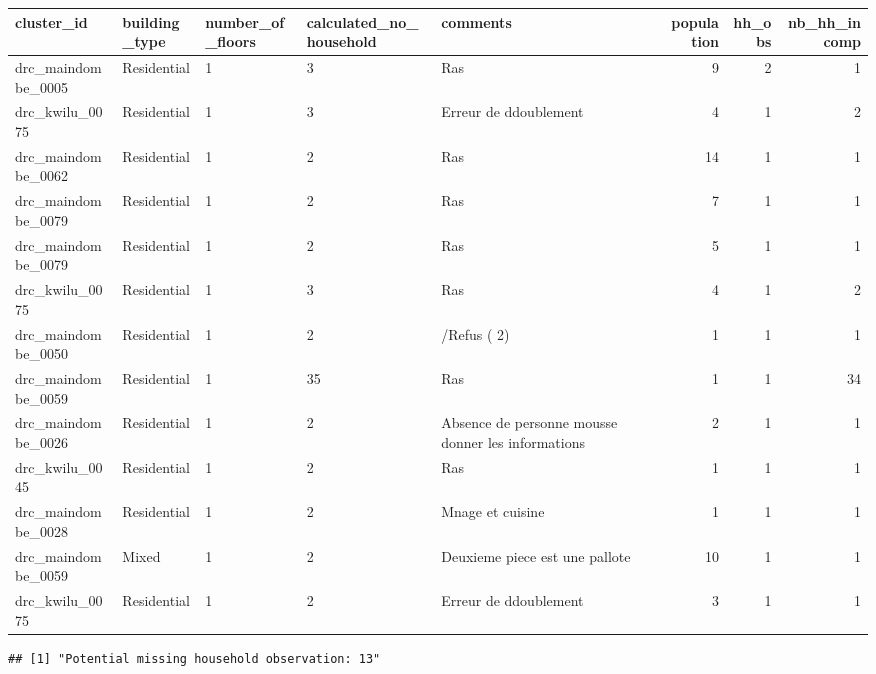 \documentclass[]{article}
\begin{document}
\begin{longtable}[]{@{}lllllrrr@{}}
\toprule
cluster\_id & building\_type & number\_of\_floors &
calculated\_no\_household & comments & population & hh\_obs &
nb\_hh\_incomp\tabularnewline
\midrule
\endhead
drc\_maindombe\_0005 & Residential & 1 & 3 & Ras & 9 & 2 &
1\tabularnewline
drc\_kwilu\_0075 & Residential & 1 & 3 & Erreur de ddoublement & 4 & 1 &
2\tabularnewline
drc\_maindombe\_0062 & Residential & 1 & 2 & Ras & 14 & 1 &
1\tabularnewline
drc\_maindombe\_0079 & Residential & 1 & 2 & Ras & 7 & 1 &
1\tabularnewline
drc\_maindombe\_0079 & Residential & 1 & 2 & Ras & 5 & 1 &
1\tabularnewline
drc\_kwilu\_0075 & Residential & 1 & 3 & Ras & 4 & 1 & 2\tabularnewline
drc\_maindombe\_0050 & Residential & 1 & 2 & /Refus ( 2) & 1 & 1 &
1\tabularnewline
drc\_maindombe\_0059 & Residential & 1 & 35 & Ras & 1 & 1 &
34\tabularnewline
drc\_maindombe\_0026 & Residential & 1 & 2 & Absence de personne mousse
donner les informations & 2 & 1 & 1\tabularnewline
drc\_kwilu\_0045 & Residential & 1 & 2 & Ras & 1 & 1 & 1\tabularnewline
drc\_maindombe\_0028 & Residential & 1 & 2 & Mnage et cuisine & 1 & 1 &
1\tabularnewline
drc\_maindombe\_0059 & Mixed & 1 & 2 & Deuxieme piece est une pallote &
10 & 1 & 1\tabularnewline
drc\_kwilu\_0075 & Residential & 1 & 2 & Erreur de ddoublement & 3 & 1 &
1\tabularnewline
\bottomrule
\end{longtable}

\begin{verbatim}
## [1] "Potential missing household observation: 13"
\end{verbatim}
\end{document}
